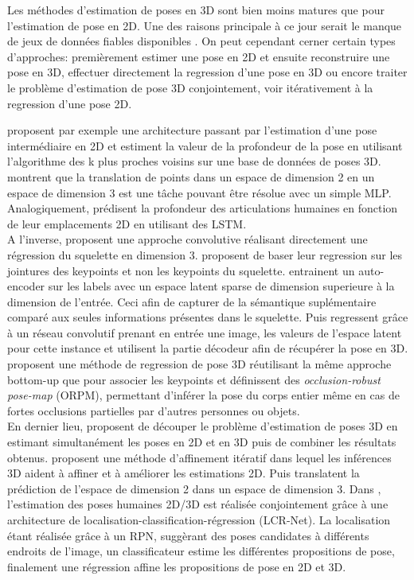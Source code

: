 Les méthodes d'estimation de poses en 3D sont bien moins matures que pour l'estimation de pose en 2D. Une des raisons principale à ce jour serait le manque de jeux de données fiables disponibles \cite{2018arXiv180309722Y}.
On peut cependant cerner certain types d'approches: premièrement estimer une pose en 2D et ensuite reconstruire une pose en 3D, effectuer directement la regression d'une pose en 3D ou encore traiter le problème d'estimation de pose 3D conjointement, voir itérativement à la regression d'une pose 2D.


\cite{2016arXiv161206524C} proposent par exemple une architecture passant par l'estimation d'une pose intermédiaire en 2D et estiment la valeur de la profondeur de la pose en utilisant l'algorithme des k plus proches voisins sur une base de données de poses 3D.
\cite{martinez2017simple} montrent que la translation de points dans un espace de dimension 2 en un espace de dimension 3 est une tâche pouvant être résolue avec un simple MLP.
Analogiquement, \cite{nie2017monocular} prédisent la profondeur des articulations humaines en fonction de leur emplacements 2D en utilisant des LSTM.\\

A l'inverse, \cite{li20143d} proposent une approche convolutive réalisant directement une régression du squelette en dimension 3. \cite{sun2017compositional} proposent de baser leur regression sur les jointures des keypoints et non les keypoints du squelette.
\cite{tekin2016structured} entrainent un auto-encoder sur les labels avec un espace latent sparse de dimension superieure à la dimension de l'entrée. Ceci afin de capturer de la sémantique suplémentaire comparé aux seules informations présentes dans le squelette. Puis regressent grâce à un réseau convolutif prenant en entrée une image, les valeurs de l'espace latent pour cette instance et utilisent la partie décodeur afin de récupérer la pose en 3D.\cite{singleshotmultiperson2018} proposent une  méthode de regression de pose 3D réutilisant la même approche bottom-up que \cite{cao2017realtime} pour associer les keypoints et définissent des \textit{occlusion-robust pose-map} (ORPM), permettant d'inférer la pose du corps entier même en cas de fortes occlusions partielles par d'autres personnes ou objets.\\

En dernier lieu, \cite{simo2013joint} proposent de découper le problème d'estimation de poses 3D en estimant simultanément les poses en 2D et en 3D puis de combiner les résultats obtenus. \cite{tome2017lifting} proposent une méthode d'affinement itératif dans lequel les inférences 3D aident à affiner et à améliorer les estimations 2D. Puis translatent la prédiction de l'espace de dimension 2 dans un espace de dimension 3. Dans \cite{rogez2019lcr}, l'estimation des poses humaines 2D/3D est réalisée conjointement grâce à une architecture de localisation-classification-régression (LCR-Net). La localisation étant réalisée grâce à un RPN, suggèrant des poses candidates à différents endroits de l'image, un classificateur estime les différentes propositions de pose, finalement une régression affine les propositions de pose en 2D et 3D.

